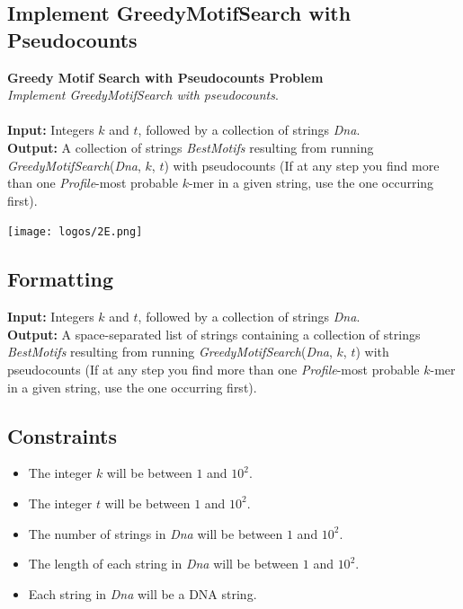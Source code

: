 \documentclass{article}
\begin{document}
\subsection{Implement GreedyMotifSearch with Pseudocounts}
\hline\vspace{5}
\noindent\textbf{Greedy Motif Search with Pseudocounts Problem}\\
\emph{Implement GreedyMotifSearch with pseudocounts}.\\ \\
\textbf{Input:} Integers $k$ and $t$, followed by a collection of strings \emph{Dna}.\\
\textbf{Output:} A collection of strings \emph{BestMotifs} resulting from running \emph{GreedyMotifSearch}(\emph{Dna}, $k$, $t$) with pseudocounts (If at any step you find more than one \emph{Profile}-most probable $k$-mer in a given string, use the one occurring first).
\begin{center}
    \texttt{[image: logos/2E.png]} 
\end{center}
\hline\vspace{5}

\subsection*{Formatting}
\textbf{Input:} Integers $k$ and $t$, followed by a collection of strings \emph{Dna}.\\
\noindent\textbf{Output:} A space-separated list of strings containing a collection of strings \emph{BestMotifs} resulting from running \emph{GreedyMotifSearch}(\emph{Dna}, $k$, $t$) with pseudocounts (If at any step you find more than one \emph{Profile}-most probable $k$-mer in a given string, use the one occurring first).

\subsection*{Constraints}
\begin{itemize}
    \item The integer $k$ will be between $1$ and $10^2$.
    \item The integer $t$ will be between $1$ and $10^2$.
    \item The number of strings in \emph{Dna} will be between $1$ and $10^2$.
    \item The length of each string in \emph{Dna} will be between $1$ and $10^2$.
    \item Each string in \emph{Dna} will be a DNA string.
\end{itemize}
\pagebreak
\end{document}

